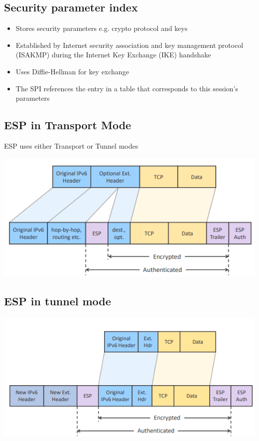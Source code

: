 \documentclass{article}
\begin{document}
\subsection{Security parameter index}
\begin{itemize}
  \item Stores security parameters e.g. crypto protocol and keys 
  \item Established by Internet security association and key management protocol (ISAKMP) during the Internet Key Exchange (IKE) handshake 
  \item Uses Diffie-Hellman for key exchange 
  \item The SPI references the entry in a table that corresponds to this session’s parameters
\end{itemize}

\subsection{ESP in Transport Mode}
\begin{flushleft}
ESP uses either Transport or Tunnel modes
\end{flushleft}

\begin{center}
  \includegraphics[scale=0.5]{esp_tunnel.png}
\end{center}

\subsection{ESP in tunnel mode}
\begin{center}
  \includegraphics[scale=0.5]{esp_tunnel_.png}
\end{center}
\end{document}
